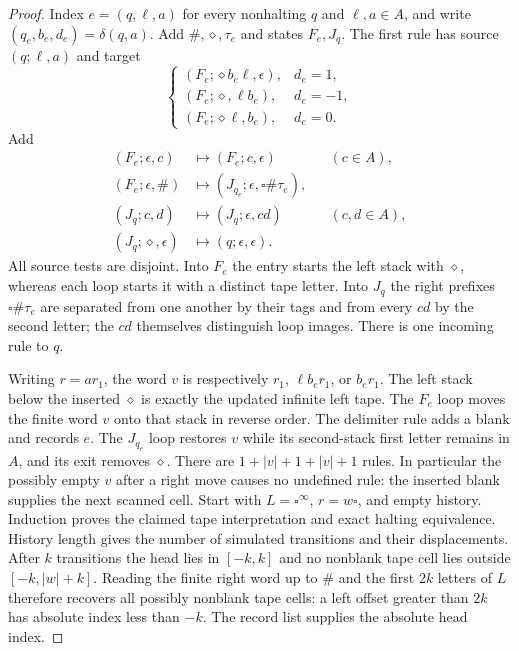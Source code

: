 \begin{proof}
Index $e=(q,\ell,a)$ for every nonhalting $q$ and $\ell,a\in A$, and write $(q_e,b_e,d_e)=\delta(q,a)$.  Add $\#,\diamond,\tau_e$ and states $F_e,J_q$.  The first rule has source $(q;\ell,a)$ and target
\[
 \begin{cases}
 (F_e;\diamond b_e\ell,\epsilon),&d_e=1,\\
 (F_e;\diamond,\ell b_e),&d_e=-1,\\
 (F_e;\diamond\ell,b_e),&d_e=0.
 \end{cases}
\]
Add
\begin{align*}
 (F_e;\epsilon,c)&\mapsto(F_e;c,\epsilon)&&(c\in A),\\
 (F_e;\epsilon,\#)&\mapsto(J_{q_e};\epsilon,\square\#\tau_e),\\
 (J_q;c,d)&\mapsto(J_q;\epsilon,cd)&&(c,d\in A),\\
 (J_q;\diamond,\epsilon)&\mapsto(q;\epsilon,\epsilon).
\end{align*}
All source tests are disjoint.  Into $F_e$ the entry starts the left stack with $\diamond$, whereas each loop starts it with a distinct tape letter.  Into $J_q$ the right prefixes $\square\#\tau_e$ are separated from one another by their tags and from every $cd$ by the second letter; the $cd$ themselves distinguish loop images.  There is one incoming rule to $q$.

Writing $r=ar_1$, the word $v$ is respectively $r_1$, $\ell b_er_1$, or $b_er_1$.  The left stack below the inserted $\diamond$ is exactly the updated infinite left tape.  The $F_e$ loop moves the finite word $v$ onto that stack in reverse order.  The delimiter rule adds a blank and records $e$.  The $J_{q_e}$ loop restores $v$ while its second-stack first letter remains in $A$, and its exit removes $\diamond$.  There are $1+|v|+1+|v|+1$ rules.  In particular the possibly empty $v$ after a right move causes no undefined rule: the inserted blank supplies the next scanned cell.  Start with $L=\square^\infty$, $r=w\square$, and empty history.  Induction proves the claimed tape interpretation and exact halting equivalence.  History length gives the number of simulated transitions and their displacements.  After $k$ transitions the head lies in $[-k,k]$ and no nonblank tape cell lies outside $[-k,|w|+k]$.  Reading the finite right word up to $\#$ and the first $2k$ letters of $L$ therefore recovers all possibly nonblank tape cells: a left offset greater than $2k$ has absolute index less than $-k$.  The record list supplies the absolute head index.
\end{proof}

